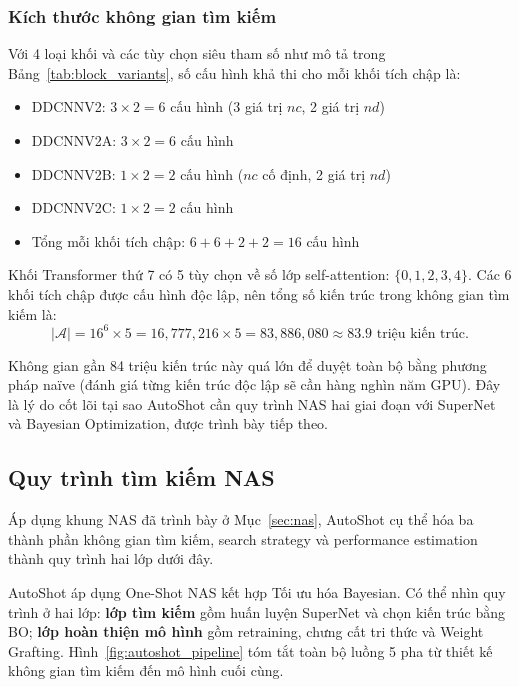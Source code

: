 \subsubsection{Kích thước không gian tìm kiếm}
\label{subsubsec:search_space_size}

Với 4 loại khối và các tùy chọn siêu tham số như mô tả trong Bảng~\ref{tab:block_variants}, số cấu hình khả thi cho mỗi khối tích chập là:
\begin{itemize}
    \item DDCNNV2: $3 \times 2 = 6$ cấu hình (3 giá trị $nc$, 2 giá trị $nd$)
    \item DDCNNV2A: $3 \times 2 = 6$ cấu hình
    \item DDCNNV2B: $1 \times 2 = 2$ cấu hình ($nc$ cố định, 2 giá trị $nd$)
    \item DDCNNV2C: $1 \times 2 = 2$ cấu hình
    \item Tổng mỗi khối tích chập: $6 + 6 + 2 + 2 = 16$ cấu hình
\end{itemize}

Khối Transformer thứ 7 có 5 tùy chọn về số lớp self-attention: $\{0, 1, 2, 3, 4\}$. Các 6 khối tích chập được cấu hình độc lập, nên tổng số kiến trúc trong không gian tìm kiếm là:
\begin{equation}
    |\mathcal{A}| = 16^6 \times 5 = 16{,}777{,}216 \times 5 = 83{,}886{,}080 \approx 83.9 \text{ triệu kiến trúc.}
    \label{eq:search_space_size}
\end{equation}

Không gian gần 84 triệu kiến trúc này quá lớn để duyệt toàn bộ bằng phương pháp naïve (đánh giá từng kiến trúc độc lập sẽ cần hàng nghìn năm GPU). Đây là lý do cốt lõi tại sao AutoShot cần quy trình NAS hai giai đoạn với SuperNet và Bayesian Optimization, được trình bày tiếp theo.

\subsection{Quy trình tìm kiếm NAS}
\label{subsec:autoshot_nas}

Áp dụng khung NAS đã trình bày ở Mục~\ref{sec:nas}, AutoShot cụ thể hóa ba thành phần không gian tìm kiếm, search strategy và performance estimation thành quy trình hai lớp dưới đây.

AutoShot áp dụng One-Shot NAS kết hợp Tối ưu hóa Bayesian. Có thể nhìn quy trình ở hai lớp: \textbf{lớp tìm kiếm} gồm huấn luyện SuperNet và chọn kiến trúc bằng BO; \textbf{lớp hoàn thiện mô hình} gồm retraining, chưng cất tri thức và Weight Grafting. Hình~\ref{fig:autoshot_pipeline} tóm tắt toàn bộ luồng 5 pha từ thiết kế không gian tìm kiếm đến mô hình cuối cùng.

